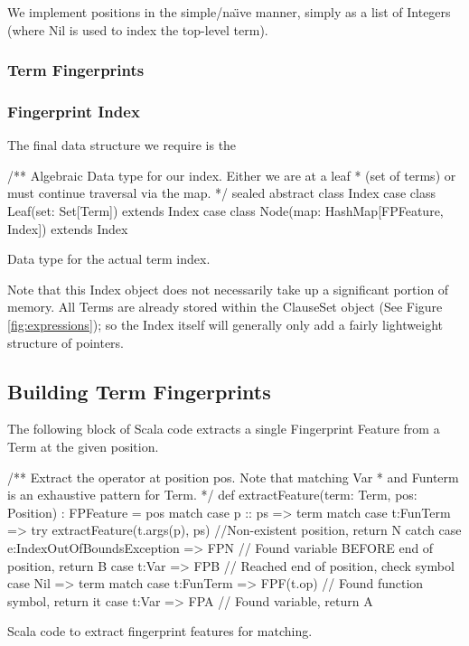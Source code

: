We implement positions in the simple/na\"{\i}ve manner, simply as a list of
Integers (where Nil is used to index the top-level term).

\subsubsection{Term Fingerprints}

\subsubsection{Fingerprint Index}

The final data structure we require is the 

\begin{listing}[H]
\begin{scalacode}
/** Algebraic Data type for our index. Either we are at a leaf
  * (set of terms) or must continue traversal via the map. */ 
sealed abstract class Index
case class Leaf(set: Set[Term])                 extends Index
case class Node(map: HashMap[FPFeature, Index]) extends Index
\end{scalacode}
\caption{Data type for the actual term index. \protect\cite[p7]{shulz12}}
\label{lst:indexdata}
\end{listing}

Note that this Index object does not necessarily take up a significant portion of memory.
All Terms are already stored within the ClauseSet object (See Figure \ref{fig:expressions});
so the Index itself will generally only add a fairly lightweight structure of pointers.


\subsection{Building Term Fingerprints}

The following block of Scala code extracts a single Fingerprint Feature from
a Term at the given position.
\begin{listing}[H]
\begin{scalacode}
 /** Extract the operator at position pos. Note that matching Var
   * and Funterm is an exhaustive pattern for Term. */
  def extractFeature(term: Term, pos: Position) : FPFeature = pos match {
    case p :: ps => term match {
      case t:FunTerm => try   {extractFeature(t.args(p), ps) }
                        //Non-existent position, return N
                        catch {case e:IndexOutOfBoundsException => FPN}
      // Found variable BEFORE end of position, return B
      case t:Var     => FPB 
    }
    // Reached end of position, check symbol
    case Nil     => term match {
      case t:FunTerm => FPF(t.op) // Found function symbol, return it
      case t:Var     => FPA       // Found variable, return A
    }
  }
\end{scalacode}
\caption{Scala code to extract fingerprint features for matching.}
\label{lst:posextract}
\end{listing} 

